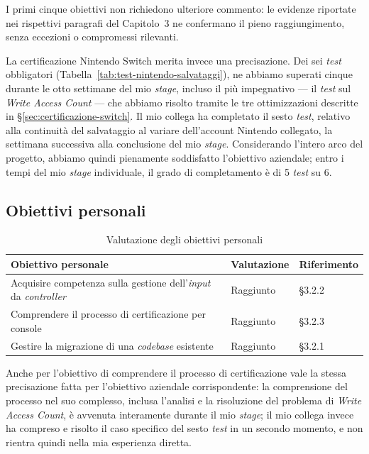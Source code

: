 I primi cinque obiettivi non richiedono ulteriore commento: le evidenze riportate nei rispettivi paragrafi del Capitolo~3 ne confermano il pieno raggiungimento, senza eccezioni o compromessi rilevanti.
 
La certificazione Nintendo Switch merita invece una precisazione. Dei sei \textit{test} obbligatori (Tabella~\ref{tab:test-nintendo-salvataggi}), ne abbiamo superati cinque durante le otto settimane del mio \textit{stage}, incluso il più impegnativo — il \textit{test} sul \textit{Write Access Count} — che abbiamo risolto tramite le tre ottimizzazioni descritte in \S\ref{sec:certificazione-switch}. Il mio collega ha completato il sesto \textit{test}, relativo alla continuità del salvataggio al variare dell'account Nintendo collegato, la settimana successiva alla conclusione del mio \textit{stage}. Considerando l'intero arco del progetto, abbiamo quindi pienamente soddisfatto l'obiettivo aziendale; entro i tempi del mio \textit{stage} individuale, il grado di completamento è di 5 \textit{test} su 6.
 
\subsection{Obiettivi personali}
 
\begin{table}[h]
\centering
\begin{tabular}{|p{6cm}|p{3cm}|p{3cm}|}
\hline
\textbf{Obiettivo personale} & \textbf{Valutazione} & \textbf{Riferimento} \\
\hline
Acquisire competenza sulla gestione dell'\textit{input} da \textit{controller} & Raggiunto & \S3.2.2 \\
\hline
Comprendere il processo di certificazione per console & Raggiunto & \S3.2.3 \\
\hline
Gestire la migrazione di una \textit{codebase} esistente & Raggiunto & \S3.2.1 \\
\hline
\end{tabular}
\caption{Valutazione degli obiettivi personali}
\label{tab:valutazione-obiettivi-personali}
\end{table}
 
Anche per l'obiettivo di comprendere il processo di certificazione vale la stessa precisazione fatta per l'obiettivo aziendale corrispondente: la comprensione del processo nel suo complesso, inclusa l'analisi e la risoluzione del problema di \textit{Write Access Count}, è avvenuta interamente durante il mio \textit{stage}; il mio collega invece ha compreso e risolto il caso specifico del sesto \textit{test} in un secondo momento, e non rientra quindi nella mia esperienza diretta.

